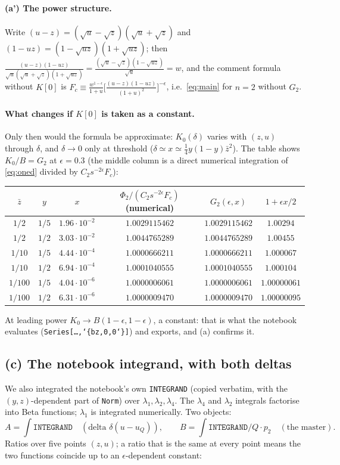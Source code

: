 \documentclass[11pt,a4paper]{article}
\newcommand{\ep}{\epsilon}
\newcommand{\zb}{\bar z}
\begin{document}
\paragraph{(a') The power structure.} Write $(u-z)=(\sqrt u-\sqrt z)(\sqrt u+\sqrt z)$ and
$(1-uz)=(1-\sqrt{uz})(1+\sqrt{uz})$; then
$\frac{(u-z)(1-uz)}{\sqrt u(\sqrt u+\sqrt z)(1+\sqrt{uz})}=\frac{(\sqrt u-\sqrt z)(1-\sqrt{uz})}{\sqrt u}=w$, and the
comment formula without $K[0]$ is
$F_c\equiv\frac{w^{1-\ep}}{1+u}\big[\frac{(u-z)(1-uz)}{(1+u)^2}\big]^{-\ep}$, i.e.\ \eqref{eq:main} for $n=2$
without $G_2$.

\paragraph{What changes if $K[0]$ is taken as a constant.} Only then would the formula be approximate: $K_0(\delta)$
varies with $(z,u)$ through $\delta$, and $\delta\to0$ only at threshold ($\delta\simeq x\simeq\frac14y(1-y)\zb^2$).
The table shows $K_0/B=G_2$ at $\ep=0.3$ (the middle column is a direct numerical integration of \eqref{eq:oned}
divided by $C_2s^{-2\ep}F_c$):

\begin{center}
\begin{tabular}{cccccc}
\toprule
$\zb$ & $y$ & $x$ & $\Phi_2/(C_2 s^{-2\ep}F_c)$ (numerical) & $G_2(\ep,x)$ & $1+\ep x/2$\\
\midrule
$1/2$   & $1/5$ & $1.96\cdot10^{-2}$ & $1.0029115462$ & $1.0029115462$ & $1.00294$\\
$1/2$   & $1/2$ & $3.03\cdot10^{-2}$ & $1.0044765289$ & $1.0044765289$ & $1.00455$\\
$1/10$  & $1/5$ & $4.44\cdot10^{-4}$ & $1.0000666211$ & $1.0000666211$ & $1.000067$\\
$1/10$  & $1/2$ & $6.94\cdot10^{-4}$ & $1.0001040555$ & $1.0001040555$ & $1.000104$\\
$1/100$ & $1/5$ & $4.04\cdot10^{-6}$ & $1.0000006061$ & $1.0000006061$ & $1.00000061$\\
$1/100$ & $1/2$ & $6.31\cdot10^{-6}$ & $1.0000009470$ & $1.0000009470$ & $1.00000095$\\
\bottomrule
\end{tabular}
\end{center}
At leading power $K_0\to B(1-\ep,1-\ep)$, a constant: that is what the notebook evaluates
(\texttt{Series[\dots,\char`\{bz,0,0\char`\}]}) and exports, and (a) confirms it.

\subsection{(c) The notebook integrand, with both deltas}
We also integrated the notebook's own \texttt{INTEGRAND} (copied verbatim, with the $(y,z)$-dependent part of
\texttt{Norm}) over $\lambda_1,\lambda_2,\lambda_4$. The $\lambda_4$ and $\lambda_2$ integrals factorise into Beta
functions; $\lambda_1$ is integrated numerically. Two objects:
\[
  A=\int\texttt{INTEGRAND}\quad(\text{delta }\delta(u-u_Q)),\qquad
  B=\int\texttt{INTEGRAND}/Q\!\cdot\!p_2\quad(\text{the master}).
\]
Ratios over five points $(z,u)$; a ratio that is the same at every point means the two functions coincide up to an
$\ep$-dependent constant:
\end{document}
